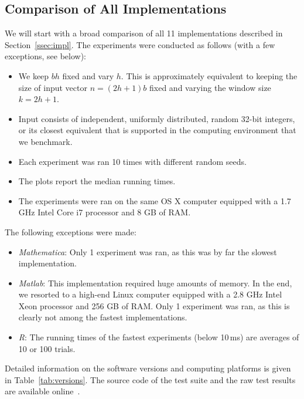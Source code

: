 \documentclass[a4paper,11pt]{article}
\begin{document}
\subsection{Comparison of All Implementations}\label{ssec:comp-other}

We will start with a broad comparison of all 11 implementations described in Section~\ref{ssec:impl}. The experiments were conducted as follows (with a few exceptions, see below):
\begin{itemize}
    \item We keep $bh$ fixed and vary $h$. This is approximately equivalent to keeping the size of input vector $n = (2h+1)b$ fixed and varying the window size $k = 2h+1$.
    \item Input consists of independent, uniformly distributed, random 32-bit integers, or its closest equivalent that is supported in the computing environment that we benchmark.
    \item Each experiment was ran 10 times with different random seeds.
    \item The plots report the median running times.
    \item The experiments were ran on the same OS X computer equipped with a 1.7 GHz Intel Core i7 processor and 8 GB of RAM.
\end{itemize}
The following exceptions were made:
\begin{itemize}
    \item \emph{Mathematica}: Only 1 experiment was ran, as this was by far the slowest implementation.
    \item \emph{Matlab}: This implementation required huge amounts of memory. In the end, we resorted to a high-end Linux computer equipped with a 2.8 GHz Intel Xeon processor and 256 GB of RAM. Only 1 experiment was ran, as this is clearly not among the fastest implementations.
    \item \emph{R}: The running times of the fastest experiments (below 10\,ms) are averages of 10 or 100 trials.
\end{itemize}
Detailed information on the software versions and computing platforms is given in Table~\ref{tab:versions}. The source code of the test suite and the raw test results are available online~.
\end{document}
